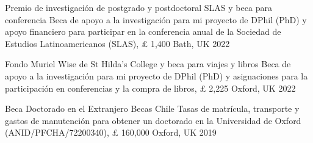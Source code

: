 





\vspace{1mm}

\begin{cvhonors}
\cvhonor
{Premio de investigación de postgrado y postdoctoral SLAS y beca para conferencia} 
{Beca de apoyo a la investigación para mi proyecto de DPhil (PhD) y apoyo financiero para participar en la conferencia anual de la Sociedad de Estudios Latinoamericanos (SLAS), {\pounds} 1,400}
{Bath, UK}
{2022}
\end{cvhonors}

\vspace{1mm}

\begin{cvhonors}
\cvhonor
{Fondo Muriel Wise de St Hilda's College y beca para viajes y libros} 
{Beca de apoyo a la investigación para mi proyecto de DPhil (PhD) y asignaciones para la participación en conferencias y la compra de libros, {\pounds} 2,225} 
{Oxford, UK}
{2022}
\end{cvhonors}

\vspace{1mm}

\begin{cvhonors}
\cvhonor
{Beca Doctorado en el Extranjero Becas Chile} 
{Tasas de matrícula, transporte y gastos de manutención para obtener un doctorado en la Universidad de Oxford (ANID/PFCHA/72200340), {\pounds} 160,000}
{Oxford, UK}
{2019}
\end{cvhonors}

\vspace{1mm}


